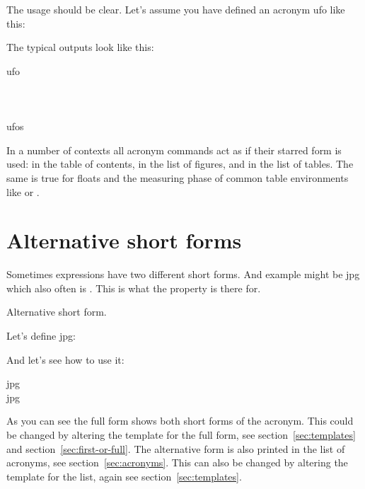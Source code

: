 \documentclass{acro-manual}
\begin{document}
The usage should be clear. Let's assume you have defined an acronym
\acs*{ufo}\label{ufo} like this:
\begin{sourcecode}
\end{sourcecode}
The typical outputs look like this:
\begin{example}
  \ac{ufo} \\
   \\
   \\
   \\
  \acfp{ufo}
\end{example}

\begin{bewareofthedog}
  In a number of contexts all acronym commands act as if their starred form is
  used: in the table of contents, in the list of figures, and in the list of
  tables.  The same is true for floats and the measuring phase of common
  table environments like  or .
\end{bewareofthedog}

\section{Alternative short forms}\label{sec:altern-short-forms}
Sometimes expressions have two different short forms. And example might be
\acs*{jpg} which also often is . This is what the property
 is there for.
\begin{properties}
    Alternative short form.
\end{properties}
Let's define \acs*{jpg}:
\begin{sourcecode}
\end{sourcecode}
And let's see how to use it:
\begin{example}
  \ac{jpg} \\
  \ac{jpg} \\
\end{example}
As you can see the full form shows both short forms of the acronym. This could
be changed by altering the template for the full form, see
section~\vref{sec:templates} and section~\vref{sec:first-or-full}.  The
alternative form is also printed in the list of acronyms, see
section~\vref{sec:acronyms}.  This can also be changed by altering the
template for the list, again see section~\ref{sec:templates}.
\end{document}

